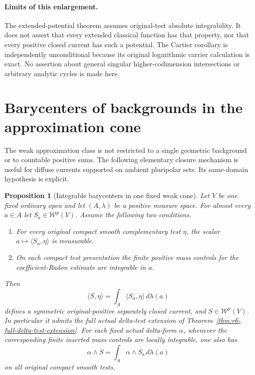 \documentclass[11pt,a4paper]{article}
\numberwithin{equation}{section}
\newtheorem{proposition}[theorem]{Proposition}
\theoremstyle{definition}
\theoremstyle{remark}
\begin{document}
\paragraph{Limits of this enlargement.}
The extended-potential theorem assumes original-test absolute
integrability. It does not assert that every extended classical
function has that property, nor that every positive closed current
has such a potential. The Cartier corollary is independently
unconditional because its original logarithmic carrier calculation
is exact. No assertion about general singular higher-codimension
intersections or arbitrary analytic cycles is made here.



\section{Barycenters of backgrounds in the approximation cone}
\label{sec:r6-delta-barycenters}

The weak approximation class is not restricted to a single geometric
background or to countable positive sums. The following elementary
closure mechanism is useful for diffuse currents supported on ambient
pluripolar sets. Its same-domain hypothesis is explicit.

\begin{proposition}[Integrable barycenters in one fixed weak cone]
\label{prop:r6-delta-barycenter}
Let $V$ be one fixed ordinary open and let $(A,\lambda)$ be a positive
measure space. For almost every $a\in A$ let
$S_a\in\mathcal W^p(V)$. Assume the following two conditions.
\begin{enumerate}
\item For every original compact smooth complementary test $\eta$,
      the scalar $a\mapsto\langle S_a,\eta\rangle$ is measurable.
\item On each compact test presentation the finite positive mass
      controls for the coefficient-Radon estimate are integrable in
      $a$.
\end{enumerate}
Then
\[
           \langle S,\eta\rangle
                    =\int_A\langle S_a,\eta\rangle\,d\lambda(a)
\]
defines a symmetric original-positive separately closed current, and
$S\in\mathcal W^p(V)$. In particular it admits the full actual
delta-test extension of Theorem~\ref{thm:r6-full-delta-test-extension}.
For each fixed actual delta-form $\alpha$, whenever the corresponding
finite inserted mass controls are locally integrable, one also has
\[
             \alpha\wedge S
                      =\int_A\alpha\wedge S_a\,d\lambda(a)
\]
on all original compact smooth tests.
\end{proposition}
\end{document}
